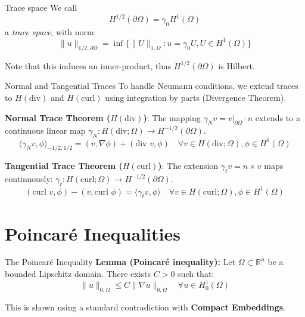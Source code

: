 \documentclass[aspectratio=169]{beamer}
\begin{document}
\begin{frame}{Trace space}
    We call     
        $$ H^{1/2}(\partial\Omega) = \gamma_0 H^1(\Omega) $$
        a \emph{trace space}, with norm
        $$ \| u \|_{1/2,\partial\Omega} = \inf\{\|U\|_{1,\Omega}: u = \gamma_0 U, U \in H^1(\Omega)\} $$

        Note that this induces an inner-product, thus $H^{1/2}(\partial\Omega)$ is Hilbert.
\end{frame}


\begin{frame}{Normal and Tangential Traces}
    To handle Neumann conditions, we extend traces to $H(\text{div})$ and $H(\text{curl})$ using integration by parts (Divergence Theorem).

    \vspace{0.2cm}
    \textbf{Normal Trace Theorem ($H(\text{div})$)}:
    The mapping $\gamma_N v = v|_{\partial\Omega} \cdot n$ extends to a continuous linear map $\gamma_N : H(\text{div}; \Omega) \to H^{-1/2}(\partial\Omega)$.
    \[
        \langle \gamma_N v, \phi \rangle_{-1/2, 1/2} = (v, \nabla \phi) + (\text{div } v, \phi) \quad \forall v \in H(\text{div}; \Omega), \phi \in H^1(\Omega) \text{}
    \]

    \vspace{0.2cm}
    \textbf{Tangential Trace Theorem ($H(\text{curl})$)}:
    The extension $\gamma_t v = n \times v$ maps continuously: $\gamma_t : H(\text{curl}; \Omega) \to H^{-1/2}(\partial\Omega)$.
    \[
        (\text{curl } v, \phi) - (v, \text{curl } \phi) = \langle \gamma_t v, \phi \rangle \quad \forall v \in H(\text{curl}; \Omega), \phi \in H^1(\Omega) \text{}
    \]
\end{frame}

\section{Poincar\'e Inequalities}

\begin{frame}{The Poincar\'e Inequality}
    \textbf{Lemma (Poincar\'e inequality):} Let $\Omega \subset \mathbb{R}^n$ be a bounded Lipschitz domain. There exists $C > 0$ such that:
    \[
        \|u\|_{0,\Omega} \le C\|\nabla u\|_{0,\Omega} \quad \forall u \in H^1_0(\Omega) \text{}
    \]


    \vspace{0.3cm}
    This is shown using a standard contradiction with \textbf{Compact Embeddings}.
\end{frame}
\end{document}
